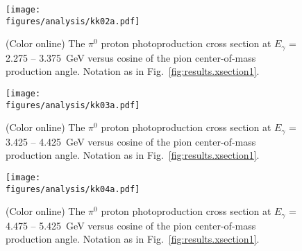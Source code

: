 \begin{figure}[h!]\begin{center}
\texttt{[image: \\figures/analysis/kk02a.pdf]}
\caption[The $\pi^0$ proton photoproduction cross section at $E_{\gamma}$ = 2.275 -- 3.375~GeV versus cosine of the pion center-of-mass production angle]{\label{fig:results.xsection2}(Color online) The $\pi^0$ proton photoproduction cross section at $E_{\gamma}$ = 2.275 -- 3.375~GeV versus cosine of the pion center-of-mass production angle. Notation as in Fig.~\protect\ref{fig:results.xsection1}.}
\end{center}\end{figure}

\begin{figure}[h!]\begin{center}
\texttt{[image: \\figures/analysis/kk03a.pdf]}
\caption[The $\pi^0$ proton photoproduction cross section at $E_{\gamma}$ = 3.425 -- 4.425~GeV versus cosine of the pion center-of-mass production angle]{\label{fig:results.xsection3}(Color online) The $\pi^0$ proton photoproduction cross section at $E_{\gamma}$ = 3.425 -- 4.425~GeV versus cosine of the pion center-of-mass production angle. Notation as in Fig.~\protect\ref{fig:results.xsection1}.}
\end{center}\end{figure}

\begin{figure}[h!]\begin{center}
\texttt{[image: \\figures/analysis/kk04a.pdf]}
\caption[The $\pi^0$ proton photoproduction cross section at $E_{\gamma}$ = 4.475 -- 5.425~GeV versus cosine of the pion center-of-mass production angle]{\label{fig:results.xsection4}(Color online) The $\pi^0$ proton photoproduction cross section at $E_{\gamma}$ = 4.475 -- 5.425~GeV versus cosine of the pion center-of-mass production angle. Notation as in Fig.~\protect\ref{fig:results.xsection1}.}
\end{center}\end{figure}
\FloatBarrier
